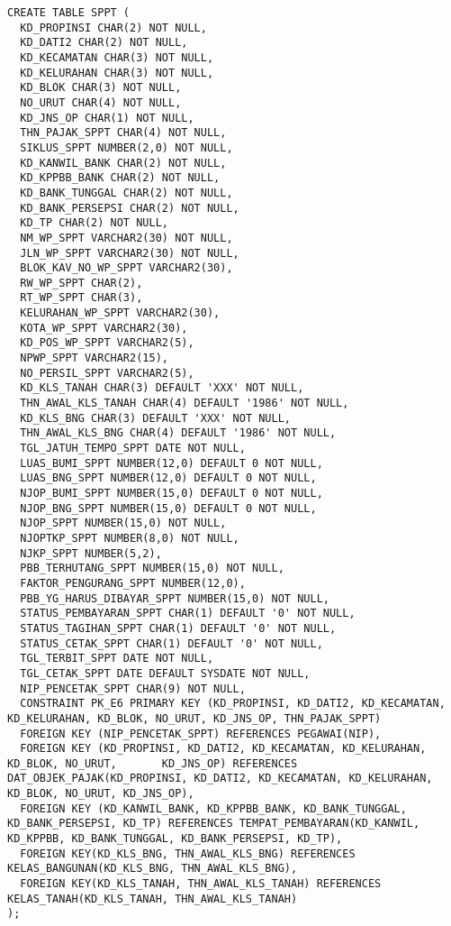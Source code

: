 \documentclass[pdftex,12pt, oneside]{article}
\begin{document}
  \begin{lstlisting}
CREATE TABLE SPPT (
  KD_PROPINSI CHAR(2) NOT NULL,
  KD_DATI2 CHAR(2) NOT NULL,
  KD_KECAMATAN CHAR(3) NOT NULL,
  KD_KELURAHAN CHAR(3) NOT NULL,
  KD_BLOK CHAR(3) NOT NULL,
  NO_URUT CHAR(4) NOT NULL, 
  KD_JNS_OP CHAR(1) NOT NULL, 
  THN_PAJAK_SPPT CHAR(4) NOT NULL,
  SIKLUS_SPPT NUMBER(2,0) NOT NULL,
  KD_KANWIL_BANK CHAR(2) NOT NULL,
  KD_KPPBB_BANK CHAR(2) NOT NULL,
  KD_BANK_TUNGGAL CHAR(2) NOT NULL,
  KD_BANK_PERSEPSI CHAR(2) NOT NULL,
  KD_TP CHAR(2) NOT NULL,
  NM_WP_SPPT VARCHAR2(30) NOT NULL,
  JLN_WP_SPPT VARCHAR2(30) NOT NULL,
  BLOK_KAV_NO_WP_SPPT VARCHAR2(30),
  RW_WP_SPPT CHAR(2),
  RT_WP_SPPT CHAR(3),
  KELURAHAN_WP_SPPT VARCHAR2(30),
  KOTA_WP_SPPT VARCHAR2(30),
  KD_POS_WP_SPPT VARCHAR2(5),
  NPWP_SPPT VARCHAR2(15),
  NO_PERSIL_SPPT VARCHAR2(5),
  KD_KLS_TANAH CHAR(3) DEFAULT 'XXX' NOT NULL,
  THN_AWAL_KLS_TANAH CHAR(4) DEFAULT '1986' NOT NULL,
  KD_KLS_BNG CHAR(3) DEFAULT 'XXX' NOT NULL,
  THN_AWAL_KLS_BNG CHAR(4) DEFAULT '1986' NOT NULL,
  TGL_JATUH_TEMPO_SPPT DATE NOT NULL,
  LUAS_BUMI_SPPT NUMBER(12,0) DEFAULT 0 NOT NULL,
  LUAS_BNG_SPPT NUMBER(12,0) DEFAULT 0 NOT NULL,
  NJOP_BUMI_SPPT NUMBER(15,0) DEFAULT 0 NOT NULL,
  NJOP_BNG_SPPT NUMBER(15,0) DEFAULT 0 NOT NULL,
  NJOP_SPPT NUMBER(15,0) NOT NULL,
  NJOPTKP_SPPT NUMBER(8,0) NOT NULL,
  NJKP_SPPT NUMBER(5,2),
  PBB_TERHUTANG_SPPT NUMBER(15,0) NOT NULL,
  FAKTOR_PENGURANG_SPPT NUMBER(12,0),
  PBB_YG_HARUS_DIBAYAR_SPPT NUMBER(15,0) NOT NULL,
  STATUS_PEMBAYARAN_SPPT CHAR(1) DEFAULT '0' NOT NULL,
  STATUS_TAGIHAN_SPPT CHAR(1) DEFAULT '0' NOT NULL,
  STATUS_CETAK_SPPT CHAR(1) DEFAULT '0' NOT NULL,
  TGL_TERBIT_SPPT DATE NOT NULL,
  TGL_CETAK_SPPT DATE DEFAULT SYSDATE NOT NULL,
  NIP_PENCETAK_SPPT CHAR(9) NOT NULL,
  CONSTRAINT PK_E6 PRIMARY KEY (KD_PROPINSI, KD_DATI2, KD_KECAMATAN, KD_KELURAHAN, KD_BLOK, NO_URUT, KD_JNS_OP, THN_PAJAK_SPPT)
  FOREIGN KEY (NIP_PENCETAK_SPPT) REFERENCES PEGAWAI(NIP),
  FOREIGN KEY (KD_PROPINSI, KD_DATI2, KD_KECAMATAN, KD_KELURAHAN, KD_BLOK, NO_URUT,       KD_JNS_OP) REFERENCES DAT_OBJEK_PAJAK(KD_PROPINSI, KD_DATI2, KD_KECAMATAN, KD_KELURAHAN, KD_BLOK, NO_URUT, KD_JNS_OP),
  FOREIGN KEY (KD_KANWIL_BANK, KD_KPPBB_BANK, KD_BANK_TUNGGAL, KD_BANK_PERSEPSI, KD_TP) REFERENCES TEMPAT_PEMBAYARAN(KD_KANWIL, KD_KPPBB, KD_BANK_TUNGGAL, KD_BANK_PERSEPSI, KD_TP),
  FOREIGN KEY(KD_KLS_BNG, THN_AWAL_KLS_BNG) REFERENCES KELAS_BANGUNAN(KD_KLS_BNG, THN_AWAL_KLS_BNG),
  FOREIGN KEY(KD_KLS_TANAH, THN_AWAL_KLS_TANAH) REFERENCES KELAS_TANAH(KD_KLS_TANAH, THN_AWAL_KLS_TANAH)
);    
  \end{lstlisting}
  
\end{document}
